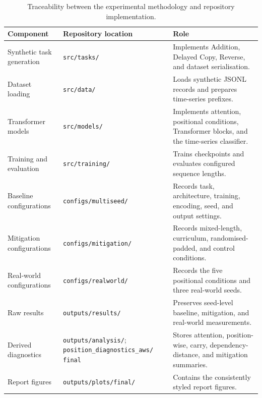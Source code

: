 \documentclass[
    author={Aanchala Ravindra Bhongade},
    supervisor={Dr. Fernando Moreno-Pino},
    degree={MSc},
    title={Length Generalisation in Transformer-Based Sequence Models: Failure Taxonomy and Mitigation Strategies},
    subtitle={},
    type={},
    year={2026}
]{dissertation}
\begin{document}
\begin{table}[htbp]
\centering
\small
\renewcommand{\arraystretch}{1.12}
\begin{tabular}{
    p{}
    p{}
    p{}
}
\hline
\textbf{Component} &
\textbf{Repository location} &
\textbf{Role} \\
\hline

Synthetic task generation &
\texttt{src/tasks/} &
Implements Addition, Delayed Copy, Reverse, and dataset serialisation. \\

Dataset loading &
\texttt{src/data/} &
Loads synthetic JSONL records and prepares time-series prefixes. \\

Transformer models &
\texttt{src/models/} &
Implements attention, positional conditions, Transformer blocks, and the
time-series classifier. \\

Training and evaluation &
\texttt{src/training/} &
Trains checkpoints and evaluates configured sequence lengths. \\

Baseline configurations &
\texttt{configs/multiseed/} &
Records task, architecture, training, encoding, seed, and output settings. \\

Mitigation configurations &
\texttt{configs/mitigation/} &
Records mixed-length, curriculum, randomised-padded, and control conditions. \\

Real-world configurations &
\texttt{configs/realworld/} &
Records the five positional conditions and three real-world seeds. \\

Raw results &
\texttt{outputs/results/} &
Preserves seed-level baseline, mitigation, and real-world measurements. \\

Derived diagnostics &
\texttt{outputs/analysis/}; \newline
\texttt{position\_diagnostics\_aws/} \newline
\texttt{final} &
Stores attention, position-wise, carry, dependency-distance, and mitigation summaries. \\

Report figures &
\texttt{outputs/plots/final/} &
Contains the consistently styled report figures. \\
\hline
\end{tabular}
\caption{Traceability between the experimental methodology and repository
implementation.}
\label{tab:appendix-repository-traceability}
\end{table}
\end{document}
